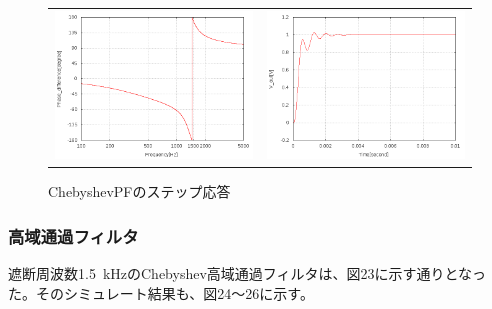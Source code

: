 \documentclass[10pt,a4j,dvipdfmx]{jsarticle}
\begin{document}
  \begin{figure}[H]
      \begin{tabular}{cc}
        \begin{minipage}[t]{0.45\hsize}
          \centering
          \includegraphics[width=8cm]{CLPF_Agraf.png}
          \caption{ChebyshevLPFの位相特性}
        \end{minipage} &
        \begin{minipage}[t]{0.45\hsize}
          \centering
          \includegraphics[width = 8cm]{CLPFstep.png}
          \caption{ChebyshevPFのステップ応答}
        \end{minipage}
      \end{tabular}
    \end{figure}
 
 \subsubsection{高域通過フィルタ}
 遮断周波数\SI{1.5}{\kilo\hertz}のChebyshev高域通過フィルタは、図23に示す通りとなった。そのシミュレート結果も、図24〜26に示す。
 
\end{document}
